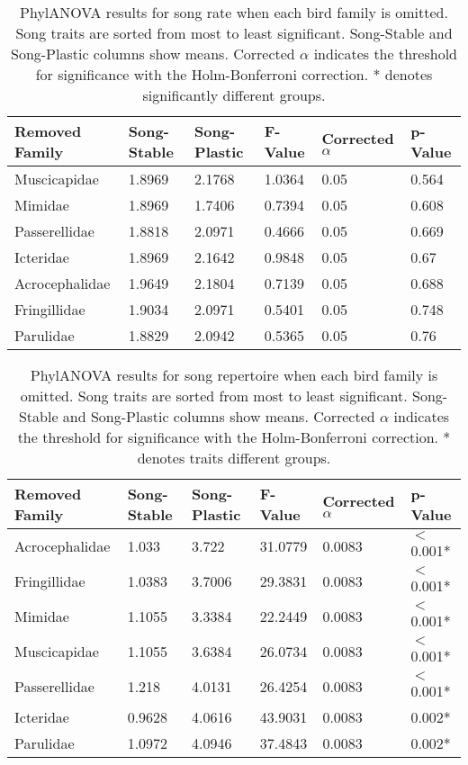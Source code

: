 \documentclass[a4paper,12pt]{article}
\begin{document}
\begin{table}[ht]
\caption{PhylANOVA results for song rate when each bird family is omitted. Song traits are sorted from most to least significant. Song-Stable and Song-Plastic columns show means. Corrected $\alpha$ indicates the threshold for significance with the Holm-Bonferroni correction. * denotes significantly different groups.}
\centering
\begin{tabular}{llllll}
  \hline
Removed Family & Song-Stable & Song-Plastic & F-Value & Corrected $\alpha$ & p-Value \\ 
  \hline
Muscicapidae & 1.8969 & 2.1768 & 1.0364 & 0.05 & 0.564 \\ 
  Mimidae & 1.8969 & 1.7406 & 0.7394 & 0.05 & 0.608 \\ 
  Passerellidae & 1.8818 & 2.0971 & 0.4666 & 0.05 & 0.669 \\ 
  Icteridae & 1.8969 & 2.1642 & 0.9848 & 0.05 & 0.67 \\ 
  Acrocephalidae & 1.9649 & 2.1804 & 0.7139 & 0.05 & 0.688 \\ 
  Fringillidae & 1.9034 & 2.0971 & 0.5401 & 0.05 & 0.748 \\ 
  Parulidae & 1.8829 & 2.0942 & 0.5365 & 0.05 & 0.76 \\ 
   \hline
\end{tabular}
\end{table}

\begin{table}[ht]
\caption{PhylANOVA results for song repertoire when each bird family is omitted. Song traits are sorted from most to least significant. Song-Stable and Song-Plastic columns show means. Corrected $\alpha$ indicates the threshold for significance with the Holm-Bonferroni correction. * denotes traits different groups.}
\centering
\begin{tabular}{llllll}
  \hline
Removed Family & Song-Stable & Song-Plastic & F-Value & Corrected $\alpha$ & p-Value \\ 
  \hline
Acrocephalidae & 1.033 & 3.722 & 31.0779 & 0.0083 & $<$0.001* \\ 
  Fringillidae & 1.0383 & 3.7006 & 29.3831 & 0.0083 & $<$0.001* \\ 
  Mimidae & 1.1055 & 3.3384 & 22.2449 & 0.0083 & $<$0.001* \\ 
  Muscicapidae & 1.1055 & 3.6384 & 26.0734 & 0.0083 & $<$0.001* \\ 
  Passerellidae & 1.218 & 4.0131 & 26.4254 & 0.0083 & $<$0.001* \\ 
  Icteridae & 0.9628 & 4.0616 & 43.9031 & 0.0083 & 0.002* \\ 
  Parulidae & 1.0972 & 4.0946 & 37.4843 & 0.0083 & 0.002* \\ 
   \hline
\end{tabular}
\end{table}
\end{document}
